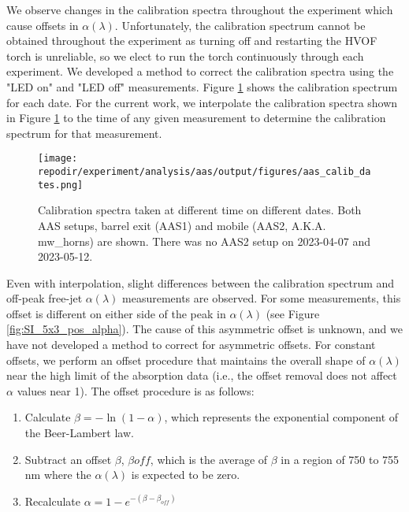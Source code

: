 We observe changes in the calibration spectra throughout the experiment which cause offsets in $\alpha(\lambda)$. Unfortunately, the calibration spectrum cannot be obtained throughout the experiment as turning off and restarting the HVOF torch is unreliable, so we elect to run the torch continuously through each experiment. We developed a method to correct the calibration spectra using the "LED on" and "LED off" measurements. Figure \ref{fig:SI_aas_calib_dates} shows the calibration spectrum for each date. For the current work, we interpolate the calibration spectra shown in Figure \ref{fig:SI_aas_calib_dates} to the time of any given measurement to determine the calibration spectrum for that measurement. 

\begin{figure}[]
    \centering
    \texttt{[image: \\repodir/experiment/analysis/aas/output/figures/aas\_calib\_dates.png]}
    \caption{Calibration spectra taken at different time on different dates. Both AAS setups, barrel exit (AAS1) and mobile (AAS2, A.K.A. mw\_horns) are shown.  There was no AAS2 setup on 2023-04-07 and 2023-05-12.}
    \label{fig:SI_aas_calib_dates}
\end{figure}


Even with interpolation, slight differences between the calibration spectrum and off-peak free-jet $\alpha(\lambda)$ measurements are observed. For some measurements, this offset is different on either side of the peak in $\alpha(\lambda)$ (see Figure \ref{fig:SI_5x3_pos_alpha}). The cause of this asymmetric offset is unknown, and we have not developed a method to correct for asymmetric offsets. For constant offsets, we perform an offset procedure that maintains the overall shape of $\alpha(\lambda)$ near the high limit of the absorption data (i.e., the offset removal does not affect $\alpha$ values near 1). The offset procedure is as follows:

\begin{enumerate}
    \item Calculate $\beta = -\ln(1 - \alpha)$, which represents the exponential component of the Beer-Lambert law. 
    \item Subtract an offset $\beta$, $\beta{off}$, which is the average of $\beta$ in a region of 750 to 755 nm where the $\alpha(\lambda)$ is expected to be zero. 
    \item Recalculate $\alpha = 1 - e^{- (\beta - \beta_{off})}$ 
\end{enumerate}

